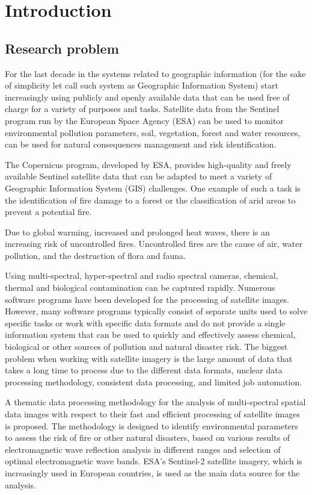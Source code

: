 \chapter{Introduction}
\label{cha:intro}

\section{Research problem}

	For the last decade in the systems related to geographic information (for the sake of simplicity let call such system as Geographic Information System) start increasingly using publicly and openly available data that can be used free of charge for a variety of purposes and tasks. Satellite data from the Sentinel program run by the European Space Agency (ESA) can be used to monitor environmental pollution parameters, soil, vegetation, forest and water resources, can be used for natural consequences management and risk identification.
	
	The Copernicus program, developed by ESA, provides high-quality and freely available Sentinel satellite data that can be adapted to meet a variety of Geographic Information System (GIS) challenges. One example of such a task is the identification of fire damage to a forest or the classification of arid areas to prevent a potential fire.
	
	Due to global warming, increased and prolonged heat waves, there is an increasing risk of uncontrolled fires. Uncontrolled fires are the cause of air, water pollution, and the destruction of flora and fauna.
	
	Using multi-spectral, hyper-spectral and radio spectral cameras, chemical, thermal and biological contamination can be captured rapidly.
	Numerous software programs have been developed for the processing of satellite images. However, many software programs typically consist of separate units used to solve specific tasks or work with specific data formats and do not provide a single information system that can be used to quickly and effectively assess chemical, biological or other sources of pollution and natural disaster risk. The biggest problem when working with satellite imagery is the large amount of data that takes a long time to process due to the different data formats, unclear data processing methodology, consistent data processing, and limited job automation.
	
	A thematic data processing methodology for the analysis of multi-spectral spatial data images with respect to their fast and efficient processing of satellite images is proposed. The methodology is designed to identify environmental parameters to assess the risk of fire or other natural disasters, based on various results of electromagnetic wave reflection analysis in different ranges and selection of optimal electromagnetic wave bands. ESA's Sentinel-2 satellite imagery, which is increasingly used in European countries, is used as the main data source for the analysis.

